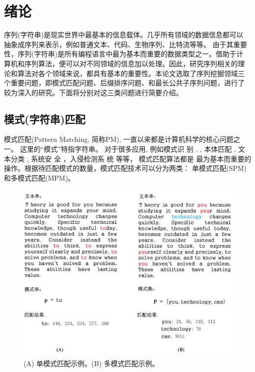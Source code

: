 \chapter{绪论}

序列(字符串)是现实世界中最基本的信息载体。几乎所有领域的数据信息都可以
抽象成序列来表示，例如普通文本、代码、生物序列、比特流等等。 由于其重要
性，序列(字符串)是所有编程语言中最为基本而重要的数据类型之一。借助于计
算机和序列算法，便可以对不同领域的信息加以处理。因此，研究序列相关的理
论和算法对各个领域来说，都具有基本的重要性。本论文选取了序列挖掘领域三
个重要问题，即模式匹配问题、后缀排序问题、和最长公共子序列问题，进行了
较为深入的研究。下面将分别对这三类问题进行简要介绍。

\section{模式(字符串)匹配}

模式匹配(Pattern Matching, 简称PM), 一直以来都是计算机科学的核心问题之
一。 这里的“模式”特指字符串。 对于很多应用, 例如模式识
别 \cite{Yan2016}, \cite{Xiao2016}, 本体匹配 \cite{Xue2015}
\cite{Xue2016}, 文本分类 \cite{Tang2015} \cite{Zhang2016}, 系统安
全 \cite{Dien2014,Malhotra2016,Fan2016}，入侵检测系
统 \cite{Kim2015,Arney2016,Sadotra2016,Lee2017} 等等， 模式匹配算法都是
最为基本而重要的操作。根据待匹配模式的数量，模式匹配技术可以分为两类：
单模式匹配(SPM)和多模式匹配(MPM)。

\begin{figure}[H]
  \centering
  \includegraphics[height=9cm ,width=14cm]{figures/1_Introduction/SPM_MPM.eps}
  \caption{(A) 单模式匹配示例。(B) 多模式匹配示例。}
  \label{fig:SPM_MPM}
\end{figure}


